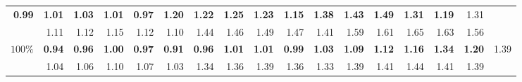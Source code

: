 \begin{table}[htbp]
\begin{tabular}{|r|rrrrr|rrrrr|rrrrr|r|}
            {\bf 0.99} & {\bf 1.01} & {\bf 1.03} & {\bf 1.01} & {\bf 0.97}   
          & {\bf 1.20} & {\bf 1.22} & {\bf 1.25} & {\bf 1.23} & {\bf 1.15}   
          & {\bf 1.38} & {\bf 1.43} & {\bf 1.49} & {\bf 1.31} & {\bf 1.19} & 1.31 \\
        & 1.11 & 1.12 & 1.15 & 1.12 & 1.10   & 1.44 & 1.46 & 1.49 & 1.47 & 1.41   & 1.59 & 1.61 & 1.65 & 1.63 & 1.56 & \\ \hline
      $100\%$ &
            {\bf 0.94} & {\bf 0.96} & {\bf 1.00} & {\bf 0.97} & {\bf 0.91}   
          & {\bf 0.96} & {\bf 1.01} & {\bf 1.01} & {\bf 0.99} & {\bf 1.03}   
          & {\bf 1.09} & {\bf 1.12} & {\bf 1.16} & {\bf 1.34} & {\bf 1.20} & 1.39 \\
        & 1.04 & 1.06 & 1.10 & 1.07 & 1.03   & 1.34 & 1.36 & 1.39 & 1.36 & 1.33   & 1.39 & 1.41 & 1.44 & 1.41 & 1.39 & \\ \hline
  \end{tabular}
\end{table}
